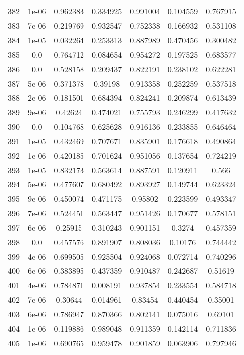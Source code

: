 \begin{table}
\begin{tabular*}{\linewidth}{c|c|c|c|c|c|c}
382 & 1e-06 & 0.962383 & 0.334925 & 0.991004 & 0.104559 & 0.767915\\
383 & 7e-06 & 0.219769 & 0.932547 & 0.752338 & 0.166932 & 0.531108\\
384 & 1e-05 & 0.032264 & 0.253313 & 0.887989 & 0.470456 & 0.300482\\
385 & 0.0 & 0.764712 & 0.084654 & 0.954272 & 0.197525 & 0.683577\\
386 & 0.0 & 0.528158 & 0.209437 & 0.822191 & 0.238102 & 0.622281\\
387 & 5e-06 & 0.371378 & 0.39198 & 0.913358 & 0.252259 & 0.537518\\
388 & 2e-06 & 0.181501 & 0.684394 & 0.824241 & 0.209874 & 0.613439\\
389 & 9e-06 & 0.42624 & 0.474021 & 0.755793 & 0.246299 & 0.417632\\
390 & 0.0 & 0.104768 & 0.625628 & 0.916136 & 0.233855 & 0.646464\\
391 & 1e-05 & 0.432469 & 0.707671 & 0.835901 & 0.176618 & 0.490864\\
392 & 1e-06 & 0.420185 & 0.701624 & 0.951056 & 0.137654 & 0.724219\\
393 & 1e-05 & 0.832173 & 0.563614 & 0.887591 & 0.120911 & 0.566\\
394 & 5e-06 & 0.477607 & 0.680492 & 0.893927 & 0.149744 & 0.623324\\
395 & 9e-06 & 0.450074 & 0.471175 & 0.95802 & 0.223599 & 0.493347\\
396 & 7e-06 & 0.524451 & 0.563447 & 0.951426 & 0.170677 & 0.578151\\
397 & 6e-06 & 0.25915 & 0.310243 & 0.901151 & 0.3274 & 0.457359\\
398 & 0.0 & 0.457576 & 0.891907 & 0.808036 & 0.10176 & 0.744442\\
399 & 4e-06 & 0.699505 & 0.925504 & 0.924068 & 0.072714 & 0.740296\\
400 & 6e-06 & 0.383895 & 0.437359 & 0.910487 & 0.242687 & 0.51619\\
401 & 4e-06 & 0.784871 & 0.008191 & 0.937854 & 0.233554 & 0.584718\\
402 & 7e-06 & 0.30644 & 0.014961 & 0.83454 & 0.440454 & 0.35001\\
403 & 6e-06 & 0.786947 & 0.870366 & 0.802141 & 0.075016 & 0.69101\\
404 & 1e-06 & 0.119886 & 0.989048 & 0.911359 & 0.142114 & 0.711836\\
405 & 1e-06 & 0.690765 & 0.959478 & 0.901859 & 0.063906 & 0.797946\\
\end{tabular*}
\end{table}
